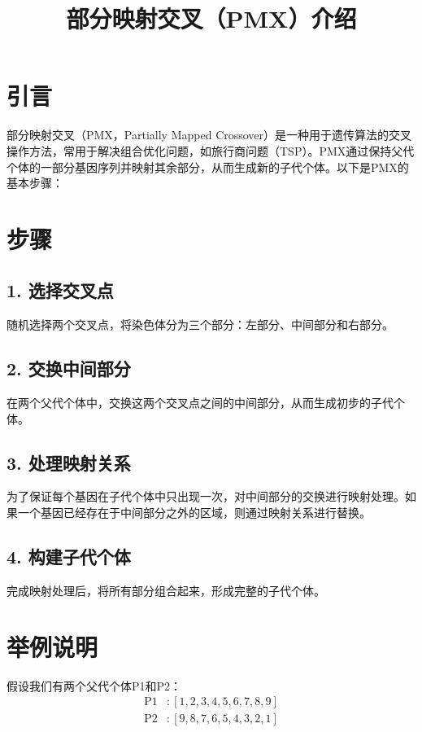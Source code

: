 \documentclass{article}
\title{部分映射交叉（PMX）介绍}
\author{}
\date{}
\begin{document}
\maketitle

\section*{引言}
部分映射交叉（PMX，Partially Mapped Crossover）是一种用于遗传算法的交叉操作方法，常用于解决组合优化问题，如旅行商问题（TSP）。PMX通过保持父代个体的一部分基因序列并映射其余部分，从而生成新的子代个体。以下是PMX的基本步骤：

\section*{步骤}

\subsection*{1. 选择交叉点}
随机选择两个交叉点，将染色体分为三个部分：左部分、中间部分和右部分。

\subsection*{2. 交换中间部分}
在两个父代个体中，交换这两个交叉点之间的中间部分，从而生成初步的子代个体。

\subsection*{3. 处理映射关系}
为了保证每个基因在子代个体中只出现一次，对中间部分的交换进行映射处理。如果一个基因已经存在于中间部分之外的区域，则通过映射关系进行替换。

\subsection*{4. 构建子代个体}
完成映射处理后，将所有部分组合起来，形成完整的子代个体。

\section*{举例说明}
假设我们有两个父代个体P1和P2：
\begin{align*}
\text{P1} &: [1, 2, 3, 4, 5, 6, 7, 8, 9] \\
\text{P2} &: [9, 8, 7, 6, 5, 4, 3, 2, 1]
\end{align*}
\end{document}
